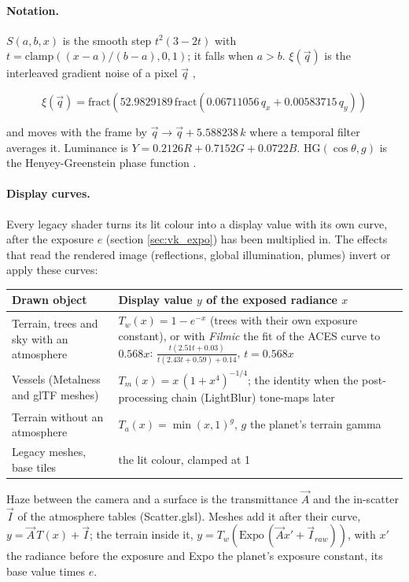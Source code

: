 \documentclass[Orbiter Technical Reference.tex]{subfiles}
\begin{document}
\begin{sloppypar}
\paragraph{Notation.} $S(a,b,x)$ is the smooth step $t^{2}(3-2t)$ with $t = \mathrm{clamp}((x-a)/(b-a), 0, 1)$; it falls when $a > b$. $\xi(\vec{q})$ is the interleaved gradient noise of a pixel $\vec{q}$ \cite{jimenez2014},

\[ \xi(\vec{q}) = \mathrm{fract}\left(52.9829189\,\mathrm{fract}(0.06711056\,q_x + 0.00583715\,q_y)\right) \]

\noindent
and moves with the frame by $\vec{q} \rightarrow \vec{q} + 5.588238\,k$ where a temporal filter averages it. Luminance is $Y = 0.2126R + 0.7152G + 0.0722B$. HG$(\cos\theta, g)$ is the Henyey-Greenstein phase function \cite{henyey1941}.

\paragraph{Display curves.} Every legacy shader turns its lit colour into a display value with its own curve, after the exposure $e$ (section \ref{sec:vk_expo}) has been multiplied in. The effects that read the rendered image (reflections, global illumination, plumes) invert or apply these curves:

\begin{longtable}{ |p{}|p{}| }
\hline\rule{0pt}{2ex}
\textbf{Drawn object} & \textbf{Display value} $y$ \textbf{of the exposed radiance} $x$\\
\hline\rule{0pt}{2ex}
Terrain, trees and sky with an atmosphere & $T_w(x) = 1 - e^{-x}$ (trees with their own exposure constant), or with \textit{Filmic} the fit of the ACES curve \cite{narkowicz2016} to $0.568x$: $\frac{t(2.51t+0.03)}{t(2.43t+0.59)+0.14}$, $t = 0.568x$\\
\hline\rule{0pt}{2ex}
Vessels (Metalness and glTF meshes) & $T_m(x) = x\,(1+x^{4})^{-1/4}$; the identity when the post-processing chain (LightBlur) tone-maps later\\
\hline\rule{0pt}{2ex}
Terrain without an atmosphere & $T_a(x) = \min(x,1)^{g}$, $g$ the planet's terrain gamma\\
\hline\rule{0pt}{2ex}
Legacy meshes, base tiles & the lit colour, clamped at 1\\
\hline
\end{longtable}

\noindent
Haze between the camera and a surface is the transmittance $\vec{A}$ and the in-scatter $\vec{I}$ of the atmosphere tables (Scatter.glsl). Meshes add it after their curve, $y = \vec{A}\,T(x) + \vec{I}$; the terrain inside it, $y = T_w(\mathrm{Expo}\,(\vec{A}x' + \vec{I}_{raw}))$, with $x'$ the radiance before the exposure and Expo the planet's exposure constant, its base value times $e$.



\end{sloppypar}
\end{document}
